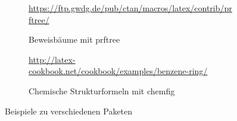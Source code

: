 \begin{figure}[p]
{\begin{subfigure}{\widefigurewidth}
		\end{subfigure}
		\colrules
		\begin{subfigure}[t]{\widefigurewidth}
			\caption{Beweisbäume mit prftree}
			\centering\tiny{\url{https://ftp.gwdg.de/pub/ctan/macros/latex/contrib/prftree/}}
			\label{fig:prftree-example}
		\end{subfigure}
		\hspace{\widefiguregap}
		\begin{subfigure}[t]{\widefigurewidth}
			\caption{Chemische Strukturformeln mit chemfig}
			\centering\tiny{\url{http://latex-cookbook.net/cookbook/examples/benzene-ring/}}
			\label{fig:chemfig-example}
		\end{subfigure}
		\medskip
	}
	\caption{Beispiele zu verschiedenen Paketen}
	\label{fig:package-examples}
\end{figure}


